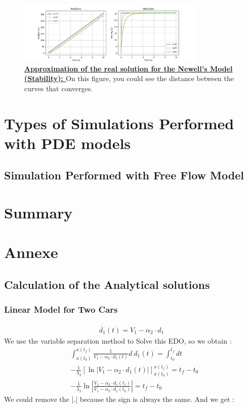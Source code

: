 \documentclass{article}
\begin{document}
	 \begin{figure}[H]
	 	\centering
	 	\includegraphics[width=0.8\textwidth]{RealSol1.png}
	 	\caption{\textbf{\underline{Approximation of the real solution for the Newell's Model (Stability): }} On this figure, you could see the distance between the curves that converges.}
	 	\label{fig:SE5}
	 \end{figure}
	
	
	
	\section{Types of Simulations Performed with PDE models}
	
	
	\subsection{Simulation Performed with Free Flow Model}

	
	\section{Summary}
	
	\section{Annexe}
	
	\subsection{Calculation of the Analytical solutions}
	
	\subsubsection{Linear Model for Two Cars}
	
	\label{eq:EDO1}
	\begin{align*} 
		\dot{d_1}(t) = V_1 - \alpha_2 \cdot d_1
	\end{align*}
	We use the variable separation method to Solve this EDO, so we obtain : 
	\begin{align*} 
		&\int_{x(t_0)}^{x(t_f)} \frac{1}{V_1 - \alpha_2 \cdot d_1(t)} d \ d_1(t) = \int_{t_0}^{t_f} dt \\
		&-\frac{1}{\lambda_2} \left[ \ln\left| V_1 - \alpha_2 \cdot d_1(t) \right| \right]_{x(t_0)}^{x(t_f)} = t_f-t_0 \\
		&-\frac{1}{\lambda_2} \ln\left| \frac{V_1 - \alpha_2 \cdot d_1(t_f)}{V_1 - \alpha_2 \cdot d_1(t_0)} \right| = t_f-t_0
	\end{align*}
	We could remove the |.| because the sign is always the same. And we get : 
	
\end{document}
